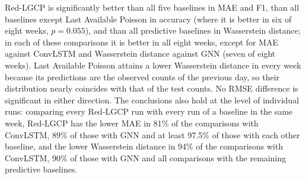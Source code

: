 Red-LGCP is significantly better than all five baselines in MAE and F1, than all baselines except Last Available Poisson in accuracy (where it is better in six of eight weeks, $p=0.055$), and than all predictive baselines in Wasserstein distance; in each of these comparisons it is better in all eight weeks, except for MAE against ConvLSTM and Wasserstein distance against GNN (seven of eight weeks). Last Available Poisson attains a lower Wasserstein distance in every week because its predictions are the observed counts of the previous day, so their distribution nearly coincides with that of the test counts. No RMSE difference is significant in either direction. The conclusions also hold at the level of individual runs: comparing every Red-LGCP run with every run of a baseline in the same week, Red-LGCP has the lower MAE in 81\% of the comparisons with ConvLSTM, 89\% of those with GNN and at least 97.5\% of those with each other baseline, and the lower Wasserstein distance in 94\% of the comparisons with ConvLSTM, 90\% of those with GNN and all comparisons with the remaining predictive baselines.

